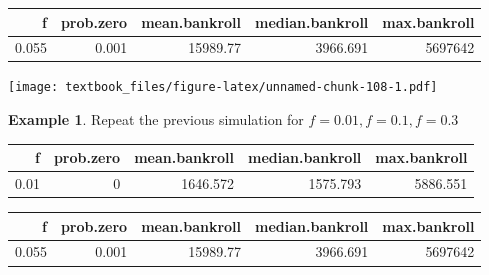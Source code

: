 \documentclass[
  11pt,
]{book}
\newenvironment{Shaded}{\begin{snugshade}}{\end{snugshade}}
\newcommand{\AttributeTok}[1]{\textcolor[rgb]{0.77,0.63,0.00}{#1}}
\newcommand{\DecValTok}[1]{\textcolor[rgb]{0.00,0.00,0.81}{#1}}
\newcommand{\FunctionTok}[1]{\textcolor[rgb]{0.00,0.00,0.00}{#1}}
\newcommand{\NormalTok}[1]{#1}
\newcommand{\SpecialCharTok}[1]{\textcolor[rgb]{0.00,0.00,0.00}{#1}}
\newcommand{\StringTok}[1]{\textcolor[rgb]{0.31,0.60,0.02}{#1}}
\theoremstyle{definition}
\theoremstyle{definition}
\newtheorem{example}{Example}[chapter]
\theoremstyle{definition}
\theoremstyle{definition}
\theoremstyle{remark}
\begin{document}
\begin{table}[H]
\centering
\begin{tabular}{rrrrr}
\toprule
f & prob.zero & mean.bankroll & median.bankroll & max.bankroll\\
\midrule
0.055 & 0.001 & 15989.77 & 3966.691 & 5697642\\
\bottomrule
\end{tabular}
\end{table}

\begin{Shaded}
\end{Shaded}

\texttt{[image: textbook\_files/figure-latex/unnamed-chunk-108-1.pdf]}

\newpage

\begin{example}
Repeat the previous simulation for \(f=0.01, f=0.1, f=0.3\)
\end{example}

\begin{table}[H]
\centering
\begin{tabular}{rrrrr}
\toprule
f & prob.zero & mean.bankroll & median.bankroll & max.bankroll\\
\midrule
0.01 & 0 & 1646.572 & 1575.793 & 5886.551\\
\bottomrule
\end{tabular}
\end{table}

\begin{table}[H]
\centering
\begin{tabular}{rrrrr}
\toprule
f & prob.zero & mean.bankroll & median.bankroll & max.bankroll\\
\midrule
0.055 & 0.001 & 15989.77 & 3966.691 & 5697642\\
\bottomrule
\end{tabular}
\end{table}
\end{document}
